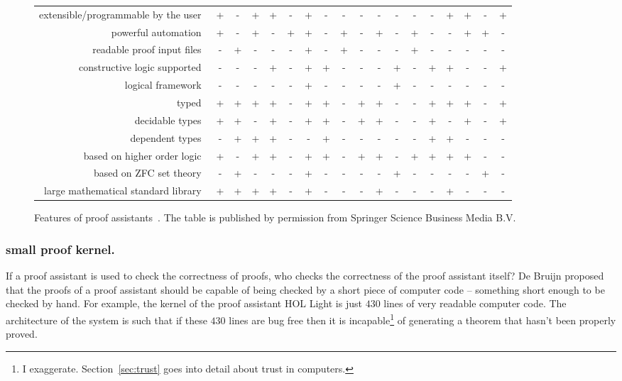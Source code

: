 \documentclass{llncs}
\newcommand{\ring}[1]{\mathbb{#1}}
\begin{document}
\begin{figure}
\begin{tabular}{|r|ccccc|ccccc|ccccc|cc|}
extensible/programmable by the user~
&+ &- &+ &+  &- &+ &- &-  &- &- &- &-  &- &+ &+ &-  &+ 
\\
powerful automation~
&+ &- &+ &-  &+ &+ &- &+  &- &+ &- &+  &- &- &+ &+  &- 
\\
readable proof input files~
&- &+ &- &-  &- &+ &- &+  &- &- &- &+  &- &- &- &-  &- 
\\
\hline
constructive logic supported~
&- &- &- &+  &- &+ &+ &-  &- &- &+ &-  &+ &+ &- &-  &+ 
\\
logical framework~
&- &- &- &-  &- &+ &- &-  &- &- &+ &-  &- &- &- &-  &- 
\\
typed~
&+ &+ &+ &+  &- &+ &+ &-  &+ &+ &- &-  &+ &+ &+ &-  &+ 
\\
decidable types~
&+ &+ &- &+  &- &+ &+ &-  &+ &+ &- &-  &+ &- &+ &-  &+ 
\\
dependent types~
&- &+ &+ &+  &- &- &+ &-  &- &- &- &-  &+ &+ &- &-  &- 
\\
\hline
based on higher order logic~
&+ &- &+ &+  &- &+ &+ &-  &+ &+ &- &+  &+ &+ &+ &-  &- 
\\
based on ZFC set theory~
&- &+ &- &-  &- &+ &- &-  &- &- &+ &-  &- &- &- &+  &- 
\\
large mathematical standard library~
&+ &+ &+ &+  &- &+ &- &-  &- &+ &- &-  &- &+ &- &-  &- 
\\
\hline
\end{tabular}
\caption{Features of proof assistants~\cite{wiedijk:17}. The table is
published by permission from Springer Science Business Media B.V.}
\label{fig:feature}
\end{figure}
\bigskip 

\subsubsection{small proof kernel.} If a proof assistant is used to
check the correctness of proofs, who checks the correctness of the
proof assistant itself?  De Bruijn proposed that the proofs of a
proof assistant should be capable of being checked by a short piece of
computer code -- something short enough to be checked by hand.  For
example, the kernel of the proof assistant HOL Light is just $430$
lines of very readable computer code.  The architecture of the system
is such that if these $430$ lines are bug free then it is
incapable\footnote{I exaggerate. Section~\ref{sec:trust} goes into
  detail about trust in computers.} of generating a theorem that
hasn't been properly proved.
\end{document}

